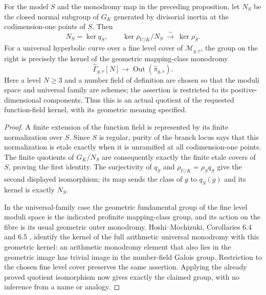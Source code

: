 \begin{proposition}
\label{A:family-kernel-quotient}
For the model $S$ and the monodromy map in the preceding
proposition, let $N_S$ be the closed normal subgroup of
$G_K$ generated by divisorial inertia at the codimension-one
points of $S$. Then
\[
 N_S=\ker q_S,\qquad
 \ker\rho_{U/K}/N_S\ \xrightarrow{\sim}\ \ker\rho_S.
\]
For a universal hyperbolic curve over a fine level cover of
$\mathcal M_{g,r}$, the group on the right is precisely the
kernel of the geometric mapping-class monodromy
\[
 \widehat\Gamma_{g,r}[N]\longrightarrow
                         \operatorname{Out}(\widehat\pi_{g,r}).
\]
Here a level $N\ge3$ and a number field of definition are
chosen so that the moduli space and universal family are
schemes; the assertion is restricted to its positive-dimensional
components. Thus this is an actual quotient of the requested
function-field kernel, with its geometric meaning specified.
\end{proposition}
\begin{proof}
A finite extension of the function field is represented by
its finite normalization over $S$. Since $S$ is regular,
purity of the branch locus says that this normalization is
etale exactly when it is unramified at all codimension-one
points. The finite quotients of $G_K/N_S$ are consequently
exactly the finite etale covers of $S$, proving the first
identity. The surjectivity of $q_S$ and
$\rho_{U/K}=\rho_Sq_S$ give the second displayed isomorphism;
its map sends the class of $g$ to $q_S(g)$ and its kernel is
exactly $N_S$.

In the universal-family case the geometric fundamental group
of the fine level moduli space is the indicated profinite
mapping-class group, and its action on the fibre is its
usual geometric outer monodromy. Hoshi--Mochizuki,
Corollaries 6.4 and 6.5 \cite{A_HoshiMochizuki2011}, identify
the kernel of the full arithmetic universal monodromy with
this geometric kernel: an arithmetic monodromy element that
also lies in the geometric image has trivial image in the
number-field Galois group. Restriction to the chosen fine
level cover preserves the same assertion. Applying the
already proved quotient isomorphism now gives exactly the
claimed group, with no inference from a name or analogy.
\end{proof}

